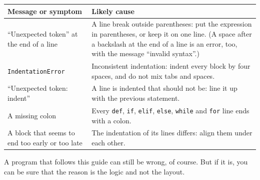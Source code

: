 \medskip
\noindent
\begin{tabular}{p{}p{}}
\hline
\textbf{Message or symptom} & \textbf{Likely cause}\\
\hline
``Unexpected token'' at the end of a line & A line break outside parentheses: put the expression in parentheses, or keep it on one line. (A space after a backslash at the end of a line is an error, too, with the message ``invalid syntax''.)\\
\texttt{IndentationError} & Inconsistent indentation: indent every block by four spaces, and do not mix tabs and spaces.\\
``Unexpected token: indent'' & A line is indented that should not be: line it up with the previous statement.\\
A missing colon & Every \texttt{def}, \texttt{if}, \texttt{elif}, \texttt{else}, \texttt{while} and \texttt{for} line ends with a colon.\\
A block that seems to end too early or too late & The indentation of its lines differs: align them under each other.\\
\hline
\end{tabular}

\medskip
\noindent
A program that follows this guide can still be wrong, of course. But if it is, you can be sure that
the reason is the logic and not the layout.


